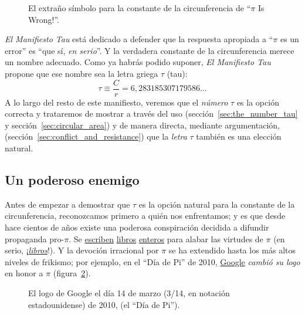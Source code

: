 \begin{figure}
\caption{El extraño símbolo para la constante de la circunferencia de ``$\pi$ Is Wrong!''.\label{fig:palais_tau}}
\end{figure}

\emph{El Manifiesto Tau} está dedicado a defender que la respuesta apropiada a ``$\pi$ es un error'' es ``que sí, \emph{en serio}''. Y la verdadera constante de la circunferencia merece un nombre adecuado. Como ya habrás podido suponer, \emph{El Manifiesto Tau} propone que ese nombre sea la letra griega $\tau$ (tau):
\begin{equation}
\label{eq:tau}
\tau \equiv \frac{C}{r} = 6{,}283185307179586\ldots
\end{equation}
A lo largo del resto de este manifiesto, veremos que el \emph{número} $\tau$ es la opción correcta y trataremos de mostrar a través del uso (sección~\ref{sec:the_number_tau} y sección~\ref{sec:circular_area}) y de manera directa, mediante argumentación, (sección~\ref{sec:conflict_and_resistance}) que la  \emph{letra} $\tau$ también es una elección natural.

\subsection{Un poderoso enemigo} %
 \label{sec:a_powerful_enemy}

Antes de empezar a demostrar que $\tau$ es la opción natural para la constante de la circunferencia, reconozcamos primero a quién nos enfrentamos; y es que desde hace cientos de años existe una poderosa conspiración decidida a difundir propaganda pro-$\pi$. Se \href{http://www.amazon.com/exec/obidos/ISBN=0802713327/parallaxproductiA/}{escriben} \href{http://www.amazon.com/Pi-Sky-Counting-Thinking-Being/dp/0198539568}{libros} \href{http://www.amazon.com/exec/obidos/ISBN=0312381859/parallaxproductiA/}{enteros} para alabar las virtudes de $\pi$ (en serio, ¡\href{http://www.amazon.com/exec/obidos/ISBN=0387989463/parallaxproductiA/}{\emph{libros}}!). Y la devoción irracional por  $\pi$ se ha extendido hasta los más altos niveles de frikismo; por ejemplo, en el ``Día de Pi'' de 2010, \href{http://www.google.com/}{Google} \emph{cambió su logo} en honor a $\pi$ (figura~\ref{fig:google_pi_day.}).

\begin{figure}
\begin{center}
\end{center}
\caption{El logo de Google el día 14 de marzo (3/14, en notación estadounidense)
de 2010, (el ``Día de Pi'').\label{fig:google_pi_day.}}
\end{figure}

